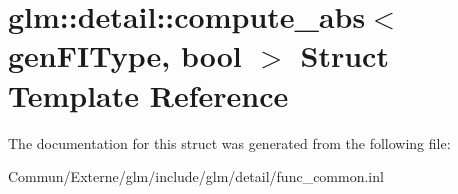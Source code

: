 \hypertarget{structglm_1_1detail_1_1compute__abs}{}\section{glm\+:\+:detail\+:\+:compute\+\_\+abs$<$ gen\+F\+I\+Type, bool $>$ Struct Template Reference}
\label{structglm_1_1detail_1_1compute__abs}


The documentation for this struct was generated from the following file\+:\begin{DoxyCompactItemize}
\item 
Commun/\+Externe/glm/include/glm/detail/func\+\_\+common.\+inl\end{DoxyCompactItemize}
